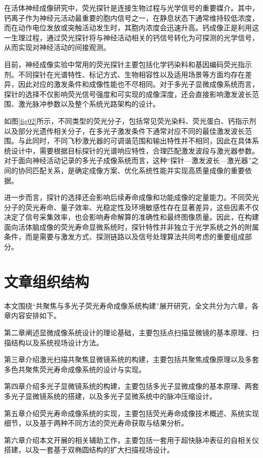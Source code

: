 在活体神经成像研究中，荧光探针是连接生物过程与光学信号的重要媒介。其中，钙离子作为神经元活动最重要的胞内信号之一，在静息状态下通常维持较低浓度，而在动作电位发放或突触活动发生时，其胞内浓度会迅速升高。钙成像正是利用这一生理过程，通过荧光探针将与神经活动相关的钙信号转化为可探测的光学信号，从而实现对神经活动的间接观测。

目前，神经成像实验中常用的荧光探针主要包括化学钙染料和基因编码荧光指示剂\cite{RN256}。不同探针在光谱特性、标记方式、生物相容性以及适用场景等方面均存在差异，因此对应的激发条件和成像性能也不尽相同。对于多光子显微成像系统而言，探针的选择不仅影响荧光信号强度和可实现的成像深度，还会直接影响激发波长范围、激光脉冲参数以及整个系统光路架构的设计。

如图\ref{fig02}所示，不同类型的荧光分子，包括常见荧光染料、荧光蛋白、钙指示剂以及部分光遗传相关分子，在多光子激发条件下通常对应不同的最佳激发波长范围。与此同时，不同飞秒激光器的可调谐范围和输出特性并不相同，因此在具体系统设计中，需要根据目标探针的光谱响应特性，合理匹配激发波段与激光器参数。对于面向神经活动记录的多光子成像系统而言，这种“探针—激发波长—激光器”之间的协同匹配关系，是确定成像方案、优化系统性能并实现高质量成像的重要依据。

进一步而言，探针的选择还会影响后续寿命成像和功能成像的定量能力。不同荧光分子的荧光寿命、量子效率、光稳定性及环境敏感性存在显著差异，这些因素不仅决定了信号采集效率，也会影响寿命解算的准确性和最终图像质量。因此，在构建面向活体脑成像的荧光寿命显微系统时，探针特性并非独立于光学系统之外的附属条件，而是需要与激发方式、探测链路以及信号处理算法共同考虑的重要组成部分。



\section{文章组织结构}\label{1.3}
本文围绕``共聚焦与多光子荧光寿命成像系统构建''展开研究，全文共分为六章，各章内容安排如下。

第二章阐述显微成像系统设计的理论基础，主要包括点扫描显微镜的基本原理、扫描结构以及系统视场设计方法。

第三章介绍激光扫描共聚焦显微镜系统的构建，主要包括共聚焦成像原理以及多套多色共聚焦荧光寿命成像系统的设计与实现。

第四章介绍多光子显微镜系统的构建，主要包括多光子显微成像的基本原理、两套多光子显微镜系统的搭建，以及多光子显微系统中的脉冲压缩设计。

第五章介绍荧光寿命成像系统的实现，主要包括荧光寿命成像技术概述、系统实现细节，以及基于两种不同方法的荧光寿命获取与结果分析。

第六章介绍本文开展的相关辅助工作，主要包括一套用于超快脉冲表征的自相关仪搭建，以及一套基于双椭圆结构的扩大扫描视场设计。